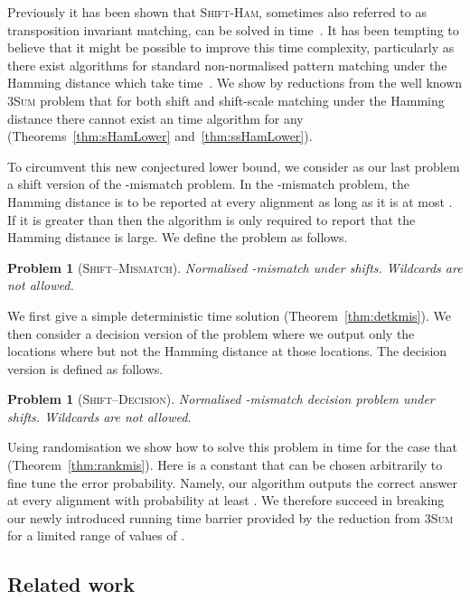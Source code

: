 \documentclass[11pt]{article}
\newcommand{\sHam}{\textsc{Shift-Ham}\xspace}
\newcommand{\skMismatch}{\textsc{Shift--Mismatch}\xspace}
\newcommand{\skDecision}{\textsc{Shift--Decision}\xspace}
\newcommand{\threeSUM}{\textsc{3Sum}\xspace}
\theoremstyle{plain}
\newtheorem{problem}[theorem]{Problem}
\theoremstyle{definition}
\begin{document}
Previously it has been shown that \sHam, sometimes also referred to as transposition invariant matching, can be solved in  time~\cite{MNU:2005}.  It has been tempting to believe that it might be possible to improve this time complexity, particularly as there exist algorithms for standard non-normalised pattern matching under the Hamming distance which take  time~\cite{Abrahamson:1987,Kosaraju:1987}.
We show by reductions from the well known \threeSUM problem that for both shift and shift-scale matching under the Hamming distance there cannot exist an  time algorithm for any  (Theorems~\ref{thm:sHamLower} and~\ref{thm:ssHamLower}).

To circumvent this new conjectured lower bound, we consider as our last problem a shift version of the -mismatch problem. In the -mismatch problem, the Hamming distance is to be reported at every alignment as long as it is at most .  If it is greater than  then the algorithm is only required to report that the Hamming distance is large.  We define the problem as follows.

\begin{problem}[\skMismatch]
    \label{prob:skMismatch}
    Normalised -mismatch under shifts. Wildcards are not allowed.

\end{problem}

We first give a simple deterministic  time solution (Theorem~\ref{thm:detkmis}).   We then consider a decision version of the problem where we output only the locations  where  but not the Hamming distance at those locations. The decision version is defined as follows.

\begin{problem}[\skDecision]
    \label{prob:skDecision}
    Normalised -mismatch decision problem under shifts. Wildcards are not allowed.

\end{problem}

Using randomisation we show how to solve this problem in  time for the case that  (Theorem~\ref{thm:rankmis}). Here  is a constant that can be chosen arbitrarily to fine tune the error probability. Namely, our algorithm outputs the correct answer at every alignment with probability at least .  We therefore succeed in breaking our newly introduced running time barrier provided by the reduction from \threeSUM for a limited range of values of .



\subsection{Related work}
\end{document}
